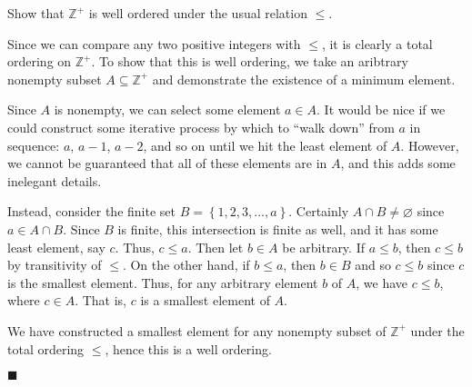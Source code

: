 \documentclass[12pt]{article}
\renewcommand{\qed}{\hfill$\blacksquare$}
\renewenvironment{proof}{\begin{addmargin}[1em]{0em}\begin{newproof}}{\end{newproof}\end{addmargin}\qed}
\newenvironment{problem}[2][Exercise]{\begin{trivlist}
\item[\hskip \labelsep {\bfseries #1}\hskip \labelsep {\bfseries #2.}]}{\end{trivlist}}
\begin{document}
\begin{problem}{I.2.4}
Show that $\mathbb{Z}^+$ is well ordered under the usual relation $\leq$.
\end{problem}
\begin{proof}
Since we can compare any two positive integers with $\leq$, it is clearly a total ordering on $\mathbb{Z}^+$.
To show that this is well ordering, we take an aribtrary nonempty subset $A\subseteq \mathbb{Z}^+$ and demonstrate the existence of a minimum element. 

Since $A$ is nonempty, we can select some element $a\in A$. It would be nice if we could construct some iterative process by which to ``walk down'' from $a$ in sequence: $a$, $a-1$, $a-2$, and so on until we hit the least element of $A$. However, we cannot be guaranteed that all of these elements are in $A$, and this adds some inelegant details.

Instead, consider the finite set $B=\left\{1,2,3,\ldots,a\right\}$. Certainly $A\cap B \neq \varnothing$ since $a \in A\cap B$. Since $B$ is finite, this intersection is finite as well, and it has some least element, say $c$. Thus, $c\leq a$. Then let $b\in A$ be arbitrary. If $a\leq b$, then $c \leq b$ by transitivity of $\leq$. On the other hand, if $b\leq a$, then $b \in B$ and so $c\leq b$ since $c$ is the smallest element. Thus, for any arbitrary element $b$ of $A$, we have $c \leq b$, where $c\in A$. That is, $c$ is a smallest element of $A$. 

We have constructed a smallest element for any nonempty subset of $\mathbb{Z}^+$ under the total ordering $\leq$, hence this is a well ordering.
\end{proof}










\end{document}
